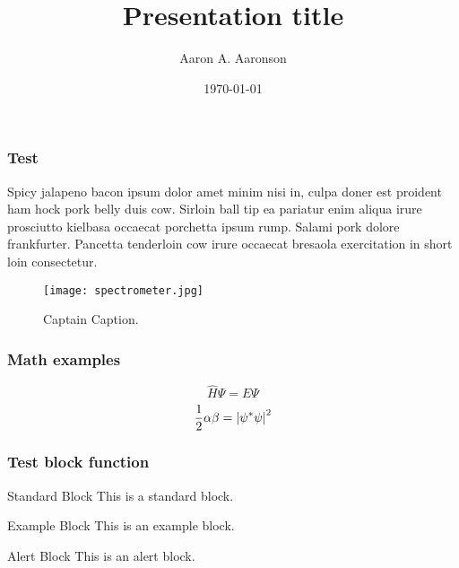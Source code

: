 \documentclass[aspectratio=43,xcolor={rgb}]{beamer}
\title{Presentation title}
\date{\today}
\author{Aaron A. Aaronson}
\begin{document}
\setcounter{page}{1}
\begin{frame}
  \titlepage
\end{frame}

\setcounter{page}{2}
\begin{frame}
  \titlepage
\end{frame}

\setcounter{page}{3}
\setcounter{framenumber}{0}
\begin{frame}
  \frametitle{Test}
  Spicy jalapeno bacon ipsum dolor amet minim nisi in, culpa doner est
  proident ham hock pork belly duis cow. Sirloin ball tip ea pariatur
  enim aliqua irure prosciutto kielbasa occaecat porchetta ipsum
  rump. Salami pork dolore frankfurter. Pancetta tenderloin cow irure
  occaecat bresaola exercitation in short loin consectetur.
  \begin{figure}[tpbh]
    \centering
    \texttt{[image: spectrometer.jpg]}
    \caption{Captain Caption.}
  \end{figure}
\end{frame}

\begin{frame}
  \frametitle{Math examples}
  \begin{equation}
    \hat{H}\Psi = E\Psi
  \end{equation}
  \begin{equation}
    \frac{1}{2}\alpha\beta = \qty|\psi^*\psi|^2
  \end{equation}
\end{frame}

\begin{frame}
  \frametitle{Test block function}
  \begin{block}{Standard Block}
    This is a standard block.
  \end{block}
  
  \begin{exampleblock}{Example Block}
    This is an example block.
  \end{exampleblock}
  
  \begin{alertblock}{Alert Block}
    This is an alert block.
  \end{alertblock}
\end{frame}

\begin{frame}
  
\end{frame}

\begin{frame}
\end{frame}
\end{document}
